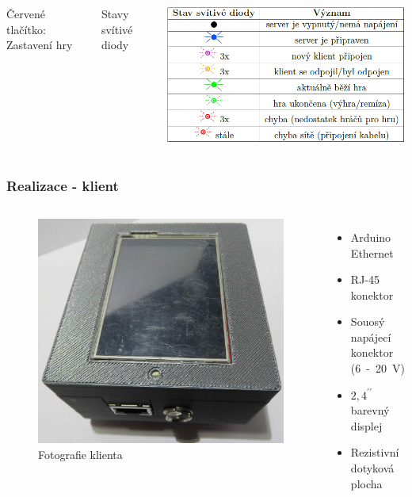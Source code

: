 \documentclass{beamer}
\begin{document}
\begin{frame}
\begin{columns}[c]
{		{\color{red} Červené tlačítko:} Zastavení hry 	
		\begin{table}
			\centering
			\caption{Stavy svítivé diody}
			\includegraphics[width=\textwidth]{img/serverLED.png}
		\end{table}
	}
\end{columns}
\end{frame}

\begin{frame}
\frametitle{Realizace - klient}
\begin{columns}[c]
	\begin{figure}
		\centering
		\includegraphics[width=\textwidth]{img/client_realizace.jpg}
		\caption{Fotografie klienta}
	\end{figure}
%
 		\begin{itemize}
 			\item Arduino Ethernet
 			\item RJ-45 konektor
 			\item Souosý napájecí konektor (6~-~20~V)
 			\item $2,4^{\prime\prime}$ barevný displej
 			\item Rezistivní dotyková plocha
 		\end{itemize}	
\end{columns}
\end{frame}
\end{document}
